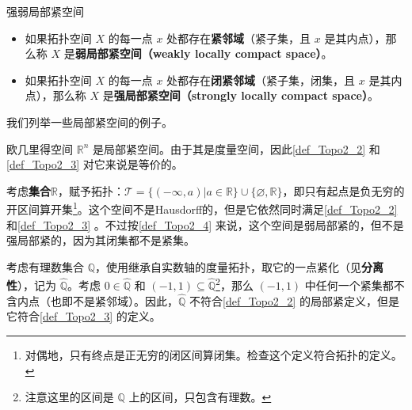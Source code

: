 \begin{definition}{强弱局部紧空间}\label{def_Topo2_4}
\begin{itemize}
\item 如果拓扑空间 $X$ 的每一点 $x$ 处都存在\textbf{紧邻域}（紧子集，且 $x$ 是其内点），那么称 $X$ 是\textbf{弱局部紧空间（weakly locally compact space）}。
\item 如果拓扑空间 $X$ 的每一点 $x$ 处都存在\textbf{闭紧邻域}（紧子集，闭集，且 $x$ 是其内点），那么称 $X$ 是\textbf{强局部紧空间（strongly locally compact space）}。
\end{itemize}
\end{definition}

我们列举一些局部紧空间的例子。

\begin{example}{}
欧几里得空间 $\mathbb{R}^n$ 是局部紧空间。由于其是度量空间，因此\autoref{def_Topo2_2} 和\autoref{def_Topo2_3} 对它来说是等价的。
\end{example}

\begin{example}{}
考虑\textbf{集合}$\mathbb{R}$，赋予拓扑：$\mathcal{T}=\{(-\infty, a)|a\in\mathbb{R}\}\cup\{\varnothing, \mathbb{R}\}$，即只有起点是负无穷的开区间算开集\footnote{对偶地，只有终点是正无穷的闭区间算闭集。检查这个定义符合拓扑的定义。}。这个空间不是Hausdorff的，但是它依然同时满足\autoref{def_Topo2_2} 和\autoref{def_Topo2_3} 。不过按\autoref{def_Topo2_4} 来说，这个空间是弱局部紧的，但不是强局部紧的，因为其闭集都不是紧集。
\end{example}

\begin{example}{}
考虑有理数集合 $\mathbb{Q}$，使用继承自实数轴的度量拓扑，取它的一点紧化（见\textbf{分离性}），记为 $\hat{\mathbb{Q}}$。考虑 $0\in\hat{\mathbb{Q}}$ 和 $(-1, 1)\subseteq\hat{\mathbb{Q}}$\footnote{注意这里的区间是 $\mathbb{Q}$ 上的区间，只包含有理数。}，那么 $(-1, 1)$ 中任何一个紧集都不含内点（也即不是紧邻域）。因此，$\hat{\mathbb{Q}}$ 不符合\autoref{def_Topo2_2} 的局部紧定义，但是它符合\autoref{def_Topo2_3} 的定义。
\end{example}












